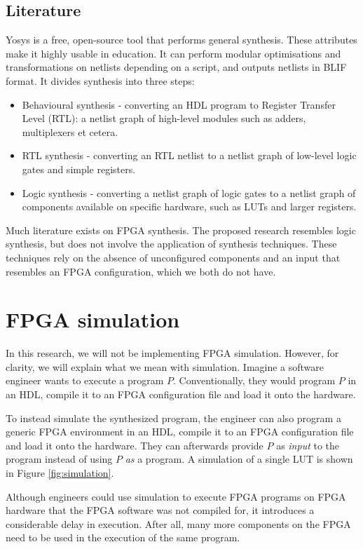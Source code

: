 \subsection{Literature}
Yosys\cite{wolf2016yosys} is a free, open-source tool that performs general synthesis. These attributes make it highly usable in education. It can perform modular optimisations and transformations on netlists depending on a script, and outputs netlists in BLIF\cite{Brayton} format. It divides synthesis into three steps:
\begin{itemize}
\item Behavioural synthesis - converting an HDL program to Register Transfer Level (RTL): a netlist graph of high-level modules such as adders, multiplexers et cetera.
\item RTL synthesis - converting an RTL netlist to a netlist graph of low-level logic gates and simple registers. 
\item Logic synthesis - converting a netlist graph of logic gates to a netlist graph of components available on specific hardware, such as LUTs and larger registers.
\end{itemize}

Much literature exists on FPGA synthesis. The proposed research resembles logic synthesis, but does not involve the application of synthesis techniques. These techniques rely on the absence of unconfigured components and an input that resembles an FPGA configuration, which we both do not have.

\section{FPGA simulation}
\label{sec:simulation}
In this research, we will not be implementing FPGA simulation. However, for clarity, we will explain what we mean with simulation. Imagine a software engineer wants to execute a program $P$. Conventionally, they would program $P$ in an HDL, compile it to an FPGA configuration file and load it onto the hardware.

To instead simulate the synthesized program, the engineer can also program a generic FPGA environment in an HDL, compile it to an FPGA configuration file and load it onto the hardware. They can afterwards provide $P$ as \textit{input} to the program instead of using $P$ \textit{as} a program. A simulation of a single LUT is shown in Figure \ref{fig:simulation}.

Although engineers could use simulation to execute FPGA programs on FPGA hardware that the FPGA software was not compiled for, it introduces a considerable delay in execution. After all, many more components on the FPGA need to be used in the execution of the same program.	

